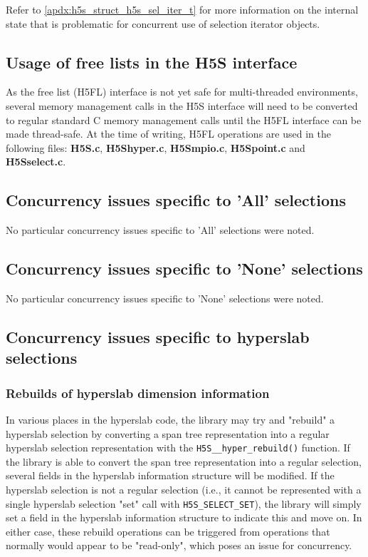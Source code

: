 \documentclass[../HDF5_RFC.tex]{subfiles}
\begin{document}
Refer to \ref{apdx:h5s_struct_h5s_sel_iter_t} for more information on the internal state
that is problematic for concurrent use of selection iterator objects.

\subsection{Usage of free lists in the H5S interface}
\label{h5s_free_lists}

As the free list (H5FL) interface is not yet safe for multi-threaded environments, several
memory management calls in the H5S interface will need to be converted to regular standard
C memory management calls until the H5FL interface can be made thread-safe. At the time of
writing, H5FL operations are used in the following files: \textbf{H5S.c}, \textbf{H5Shyper.c},
\textbf{H5Smpio.c}, \textbf{H5Spoint.c} and \textbf{H5Sselect.c}.

\subsection{Concurrency issues specific to 'All' selections}
\label{h5s_concurrency_all}

No particular concurrency issues specific to 'All' selections were noted.

\subsection{Concurrency issues specific to 'None' selections}
\label{h5s_concurrency_none}

No particular concurrency issues specific to 'None' selections were noted. 

\subsection{Concurrency issues specific to hyperslab selections}
\label{h5s_concurrency_hyper}

\subsubsection{Rebuilds of hyperslab dimension information}
\label{h5s_diminfo_rebuild}

In various places in the hyperslab code, the library may try and "rebuild" a hyperslab
selection by converting a span tree representation into a regular hyperslab selection
representation with the \texttt{H5S\_\_hyper\_rebuild()} function. If the library is
able to convert the span tree representation into a regular selection, several fields
in the hyperslab information structure will be modified. If the hyperslab selection is
not a regular selection (i.e., it cannot be represented with a single hyperslab selection
"set" call with \texttt{H5S\_SELECT\_SET}), the library will simply set a field in the
hyperslab information structure to indicate this and move on. In either case, these
rebuild operations can be triggered from operations that normally would appear to be
"read-only", which poses an issue for concurrency.
\end{document}
